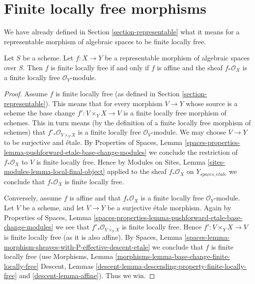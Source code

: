 \section{Finite locally free morphisms}
\label{section-finite-locally-free}

\noindent
We have already defined in Section \ref{section-representable}
what it means for a representable morphism of algebraic spaces
to be finite locally free.

\begin{lemma}
\label{lemma-finite-locally-free-representable}
Let $S$ be a scheme. Let $f : X \to Y$ be a representable
morphism of algebraic spaces over $S$. Then
$f$ is finite locally free if and only if $f$ is affine and
the sheaf $f_*\mathcal{O}_X$ is a finite locally free
$\mathcal{O}_Y$-module.
\end{lemma}

\begin{proof}
Assume $f$ is finite locally free (as defined in
Section \ref{section-representable}). This means that
for every morphism $V \to Y$ whose source is a scheme the
base change $f' : V \times_Y X \to V$ is a finite locally free morphism
of schemes. This in turn means (by the definition of a finite locally
free morphism of schemes) that
$f'_*\mathcal{O}_{V \times_Y X}$
is a finite locally free $\mathcal{O}_V$-module. We may choose $V \to Y$
to be surjective and \'etale. By
Properties of Spaces,
Lemma \ref{spaces-properties-lemma-pushforward-etale-base-change-modules}
we conclude the restriction of $f_*\mathcal{O}_X$ to $V$ is
finite locally free. Hence by
Modules on Sites, Lemma \ref{sites-modules-lemma-local-final-object}
applied to the sheaf $f_*\mathcal{O}_X$ on $Y_{spaces, \acute{e}tale}$
we conclude that $f_*\mathcal{O}_X$ is finite locally free.

\medskip\noindent
Conversely, assume $f$ is affine and that $f_*\mathcal{O}_X$ is a finite
locally free $\mathcal{O}_Y$-module. Let $V$ be a scheme, and let
$V \to Y$ be a surjective \'etale morphism. Again by
Properties of Spaces,
Lemma \ref{spaces-properties-lemma-pushforward-etale-base-change-modules}
we see that $f'_*\mathcal{O}_{V \times_Y X}$ is finite locally free.
Hence $f' : V \times_Y X \to V$ is finite locally free (as it is also affine).
By
Spaces,
Lemma \ref{spaces-lemma-morphism-sheaves-with-P-effective-descent-etale}
we conclude that $f$ is finite locally free (use
Morphisms, Lemma \ref{morphisms-lemma-base-change-finite-locally-free}
Descent, Lemmas \ref{descent-lemma-descending-property-finite-locally-free}
and \ref{descent-lemma-affine}). Thus we win.
\end{proof}

